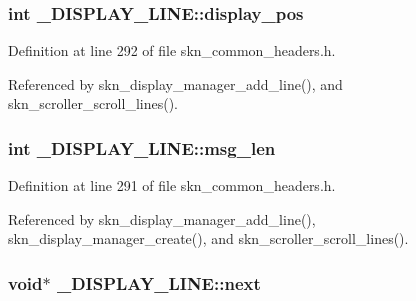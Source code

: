 \subsubsection[{\texorpdfstring{display\+\_\+pos}{display_pos}}]{\setlength{\rightskip}{0pt plus 5cm}int \+\_\+\+D\+I\+S\+P\+L\+A\+Y\+\_\+\+L\+I\+N\+E\+::display\+\_\+pos}\hypertarget{struct___d_i_s_p_l_a_y___l_i_n_e_af32b1aa2ce817c27695d7cd43db9364d}{}\label{struct___d_i_s_p_l_a_y___l_i_n_e_af32b1aa2ce817c27695d7cd43db9364d}


Definition at line 292 of file skn\+\_\+common\+\_\+headers.\+h.



Referenced by skn\+\_\+display\+\_\+manager\+\_\+add\+\_\+line(), and skn\+\_\+scroller\+\_\+scroll\+\_\+lines().

\subsubsection[{\texorpdfstring{msg\+\_\+len}{msg_len}}]{\setlength{\rightskip}{0pt plus 5cm}int \+\_\+\+D\+I\+S\+P\+L\+A\+Y\+\_\+\+L\+I\+N\+E\+::msg\+\_\+len}\hypertarget{struct___d_i_s_p_l_a_y___l_i_n_e_aa9cfa1dd3e90386f675fef61e711342e}{}\label{struct___d_i_s_p_l_a_y___l_i_n_e_aa9cfa1dd3e90386f675fef61e711342e}


Definition at line 291 of file skn\+\_\+common\+\_\+headers.\+h.



Referenced by skn\+\_\+display\+\_\+manager\+\_\+add\+\_\+line(), skn\+\_\+display\+\_\+manager\+\_\+create(), and skn\+\_\+scroller\+\_\+scroll\+\_\+lines().

\subsubsection[{\texorpdfstring{next}{next}}]{\setlength{\rightskip}{0pt plus 5cm}void$\ast$ \+\_\+\+D\+I\+S\+P\+L\+A\+Y\+\_\+\+L\+I\+N\+E\+::next}\hypertarget{struct___d_i_s_p_l_a_y___l_i_n_e_a0668a4de4eb91d9bbd03cc52b00f4fd0}{}\label{struct___d_i_s_p_l_a_y___l_i_n_e_a0668a4de4eb91d9bbd03cc52b00f4fd0}


